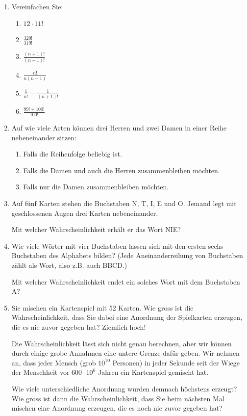 \begin{ueb}
    {}{}
    \begin{enumerate}
        \item Vereinfachen Sie:
              \begin{enumerate}
                  \item \(12 \cdot 11!\)
                  \item \(\frac{320!}{319!}\)
                  \item \(\frac{(n+1)!}{(n-1)!}\)
                  \item \(\frac{n!}{n(n-1)}\)
                  \item \(\frac{1}{n!} - \frac{1}{(n+1)!}\)
                  \item \(\frac{99! + 100!}{100!}\)
              \end{enumerate}

        \item Auf wie viele Arten können drei Herren und zwei Damen in einer Reihe nebeneinander sitzen:
              \begin{enumerate}
                  \item Falls die Reihenfolge beliebig ist.
                  \item Falls die Damen und auch die Herren zusammenbleiben möchten.
                  \item Falls nur die Damen zusammenbleiben möchten.
              \end{enumerate}

        \item Auf fünf Karten stehen die Buchstaben N, T, I, E und O. Jemand legt mit geschlossenen Augen drei Karten nebeneinander.

              Mit welcher Wahrscheinlichkeit erhält er das Wort NIE?


        \item Wie viele Wörter mit vier Buchstaben lassen sich mit den ersten sechs Buchstaben des Alphabets bilden? (Jede Aneinanderreihung von Buchstaben zählt als Wort, also z.B. auch BBCD.)

              Mit welcher Wahrscheinlichkeit endet ein solches Wort mit dem Buchstaben A?

        \item
              Sie mischen ein Kartenspiel mit 52 Karten. Wie gross ist die Wahrscheinlichkeit, dass Sie dabei eine Anordnung der Spielkarten erzeugen, die es nie zuvor gegeben hat? Ziemlich hoch!

              Die Wahrscheinlichkeit lässt sich nicht genau berechnen, aber wir können durch einige grobe Annahmen eine untere Grenze dafür geben. Wir nehmen an, dass jeder Mensch (grob \(10^{10}\) Personen) in jeder Sekunde seit der Wiege der Menschheit vor \(600\cdot10^6\) Jahren ein Kartenspiel gemischt hat.

              Wie viele unterschiedliche Anordnung wurden demnach höchstens erzeugt? Wie gross ist dann die Wahrscheinlichkeit, dass Sie beim nächsten Mal mischen eine Anordnung erzeugen, die es noch nie zuvor gegeben hat?


    \end{enumerate}
\end{ueb}

